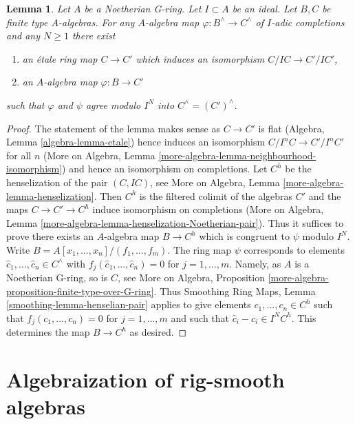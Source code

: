 \documentclass{stacks-project}
\theoremstyle{plain}
\newtheorem{lemma}[subsection]{Lemma}
\theoremstyle{definition}
\theoremstyle{remark}
\numberwithin{equation}{subsection}
\begin{document}
\begin{lemma}
\label{lemma-fully-faithfulness}
Let $A$ be a Noetherian G-ring. Let $I \subset A$ be an ideal.
Let $B, C$ be finite type $A$-algebras. For any $A$-algebra map
$\varphi : B^\wedge \to C^\wedge$ of $I$-adic completions and any
$N \geq 1$ there exist
\begin{enumerate}
\item an \'etale ring map $C \to C'$ which induces
an isomorphism $C/IC \to C'/IC'$,
\item an $A$-algebra map $\varphi : B \to C'$
\end{enumerate}
such that $\varphi$ and $\psi$ agree modulo $I^N$
into $C^\wedge = (C')^\wedge$.
\end{lemma}

\begin{proof}
The statement of the lemma makes sense as $C \to C'$ is flat
(Algebra, Lemma \ref{algebra-lemma-etale}) hence induces an isomorphism
$C/I^nC \to C'/I^nC'$ for all $n$
(More on Algebra, Lemma \ref{more-algebra-lemma-neighbourhood-isomorphism})
and hence an isomorphism on completions.
Let $C^h$ be the henselization of the pair $(C, IC)$, see
More on Algebra, Lemma \ref{more-algebra-lemma-henselization}.
Then $C^h$ is the filtered colimit of the algebras $C'$
and the maps
$C \to C' \to C^h$ induce isomorphism on completions (More on Algebra,
Lemma \ref{more-algebra-lemma-henselization-Noetherian-pair}).
Thus it suffices to prove there exists an $A$-algebra map
$B \to C^h$ which is congruent to $\psi$ modulo $I^N$.
Write $B = A[x_1, \ldots, x_n]/(f_1, \ldots, f_m)$.
The ring map $\psi$ corresponds to elements
$\hat c_1, \ldots, \hat c_n \in C^\wedge$ with
$f_j(\hat c_1, \ldots, \hat c_n) = 0$ for $j = 1, \ldots, m$.
Namely, as $A$ is a Noetherian G-ring, so is $C$, see
More on Algebra, Proposition
\ref{more-algebra-proposition-finite-type-over-G-ring}.
Thus Smoothing Ring Maps,
Lemma \ref{smoothing-lemma-henselian-pair}
applies to give elements $c_1, \ldots, c_n \in C^h$ such
that $f_j(c_1, \ldots, c_n) = 0$ for $j = 1, \ldots, m$
and such that $\hat c_i - c_i \in I^NC^h$.
This determines the map $B \to C^h$ as desired.
\end{proof}







\section{Algebraization of rig-smooth algebras}
\label{section-algebraization-rig-smooth}
\end{document}
